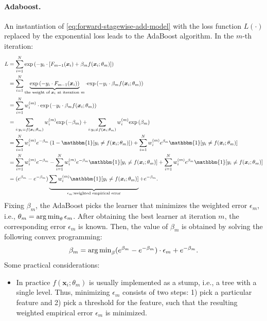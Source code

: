         \paragraph{Adaboost.} An instantiation of \eqref{eq:forward-stagewise-add-model} with the loss function $L(\cdot)$ replaced by the exponential loss leads to the AdaBoost algorithm.
        In the $m$-th iteration:
            \begin{equation}
                \begin{aligned}
                    L & = \sum_{i=1}^{\ndata}{ \EXP{ - y_i \cdot \left[F_{m-1}(\bm{x}_i) + \beta_m f(\bm{x}_i; \theta_m) \right] } }\\
                      & = \sum_{i=1}^{\ndata}{\underbrace{\EXP{-y_i \cdot F_{m-1}(\bm{x}_i)}}_{\text{the weight of $\bm{x}_i$ at iteration $m$}} \cdot \EXP{-y_i \cdot \beta_m f(\bm{x}_i; \theta_m)} }\\
                      & = \sum_{i=1}^{\ndata}{w_i^{(m)} \cdot \EXP{-y_i \cdot \beta_m f(\bm{x}_i; \theta_m)}} \\
                      & = \sum_{i:y_i = f(\bm{x}_i;\theta_m)}^{}{w_i^{(m)} \EXP{-\beta_m}} + \sum_{i:y_i \ne f(\bm{x}_i;\theta_m)}^{}{w_i^{(m)} \EXP{\beta_m}} \\
                      & = \sum_{i=1}^{\ndata}{w^{(m)}_i e^{-\beta_m} \left( 1- \mathbbm{1}[y_i \ne f(\bm{x}_i; \theta_m)] \right)} + \sum_{i=1}^{\ndata}{w^{(m)}_i e^{\beta_m} \mathbbm{1}[y_i \ne f(\bm{x}_i; \theta_m)]} \\
                      & = \sum_{i=1}^{\ndata}{w^{(m)}_i e^{-\beta_m}} - \sum_{i=1}^{\ndata}{w^{(m)}_i e^{-\beta_m} \mathbbm{1}[y_i \ne f(\bm{x}_i; \theta_m)]} + \sum_{i=1}^{\ndata}{w^{(m)}_i e^{\beta_m} \mathbbm{1}[y_i \ne f(\bm{x}_i; \theta_m)]} \\
                      & = (e^{\beta_m} - e^{-\beta_m}) \underbrace{\sum_{}^{}{w^{(m)}_i \mathbbm{1}[y_i \ne f(\bm{x}_i; \theta_m)]}}_{\epsilon_m: \text{weighted empirical error}} + e^{-\beta_m}.
                \end{aligned}
            \end{equation}
        Fixing $\beta_m$, the AdaBoost picks the learner that minimizes the weighted error $\epsilon_m$, i.e., $\theta_m = \operatorname{arg\,min}_{\theta} \epsilon_m$.
        After obtaining the best learner at iteration $m$, the corresponding error $\epsilon_m$ is known.
        Then, the value of $\beta_m$ is obtained by solving the following convex programming:
        \begin{equation}
            \beta_m = \operatorname{arg\,min}_{\beta} (e^{\beta_m} - e^{-\beta_m}) \cdot \epsilon_m + e^{-\beta_m}.
        \end{equation}
         Some practical considerations:
        \begin{itemize}
            \item In practice $f(\bm{x}_i; \theta_m)$ is usually implemented as a stump, i.e., a tree with a single level.
            Thus, minimizing $\epsilon_m$ consists of two steps: 1) pick a particular feature and 2) pick a threshold for the feature, such that the resulting weighted empirical error $\epsilon_m$ is minimized.
        \end{itemize}
        
